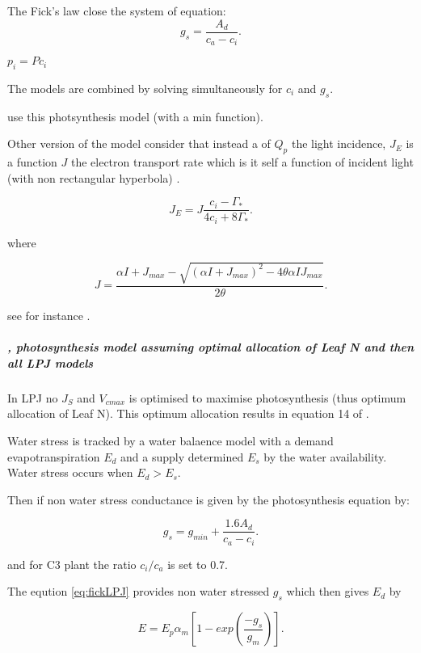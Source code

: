 \documentclass[a4paper,11pt]{article}
\begin{document}
The Fick's law close the system of equation:
\begin{equation}
\label{eq:fick}
g_s=\frac{A_d}{c_a - c_i}.
\end{equation}

$p_i = P c_i$

The models are combined by solving simultaneously for $c_i$ and $g_s$.

\citet{Scheiter-2009} use this photsynthesis model (with a min function).

Other version of the model consider that instead a of $Q_p$ the light incidence, $J_E$ is a function $J$ the electron transport rate which is it self a function of incident light (with non rectangular hyperbola) \citep{Sharkey-2007}.

\begin{equation}
\label{eq:JCb}
J_E = J \frac{ c_i - \Gamma_*}{4c_i + 8 \Gamma_*}.
\end{equation}

where

\begin{equation}
\label{eq:Jlight}
J = \frac{ \alpha I + J_{max} - \sqrt{(\alpha I + J_{max})^2 - 4 \theta \alpha I J_{max}}}{2\theta}.
\end{equation}

see for instance \citet{Bernacchi-2009}.


\subparagraph{\citet{Haxeltine-1996}, photosynthesis model assuming optimal allocation of Leaf N and then all LPJ models}

In LPJ no $J_S$ and $V_{cmax}$ is optimised to maximise photosynthesis (thus optimum allocation of Leaf N). This optimum allocation results in equation 14 of \citet{Sitch-2008}.

Water stress is tracked by a water balaence model with a demand evapotranspiration $E_d$ and a supply determined $E_s$ by the water availability. Water stress occurs when $E_d > E_s$.

Then if non water stress conductance is given by the photosynthesis equation by:

\begin{equation}
\label{eq:fickLPJ}
g_s=g_{min} + \frac{1.6A_d}{c_a - c_i}.
\end{equation}

and for C3 plant the ratio $c_i / c_a$ is set to 0.7.

The eqution \ref{eq:fickLPJ} provides non water stressed $g_s$ which then gives $E_{d}$ by

\begin{equation}
\label{eq:12Sitch}
E=E_p \alpha_m [1 - exp(\frac{- g_s}{g_m})].
\end{equation}
\end{document}
